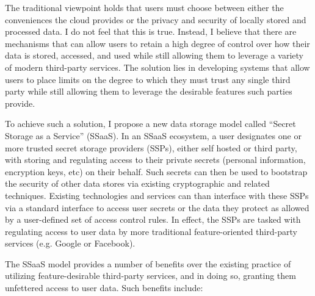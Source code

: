 The traditional viewpoint holds that users must choose between either
the conveniences the cloud provides or the privacy and security of
locally stored and processed data. I do not feel that this is
true. Instead, I believe that there are mechanisms that can allow
users to retain a high degree of control over how their data is
stored, accessed, and used while still allowing them to leverage a
variety of modern third-party services. The solution lies in
developing systems that allow users to place limits on the degree to
which they must trust any single third party while still allowing them
to leverage the desirable features such parties provide.

To achieve such a solution, I propose a new data storage model called
``Secret Storage as a Service'' (SSaaS). In an SSaaS ecosystem, a user
designates one or more trusted secret storage providers (SSPs), either
self hosted or third party, with storing and regulating access to
their private secrets (personal information, encryption keys, etc) on
their behalf. Such secrets can then be used to bootstrap the security
of other data stores via existing cryptographic and related
techniques. Existing technologies and services can than interface with
these SSPs via a standard interface to access user secrets or the data
they protect as allowed by a user-defined set of access control
rules. In effect, the SSPs are tasked with regulating access to user
data by more traditional feature-oriented third-party services
(e.g. Google or Facebook).

The SSaaS model provides a number of benefits over the existing
practice of utilizing feature-desirable third-party services, and in
doing so, granting them unfettered access to user data. Such benefits
include:


